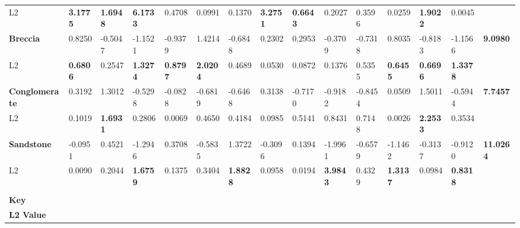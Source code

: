 \begin{landscape}
\begin{table}[H]
{\begin{tabular}{@{}lllllllllllllll@{}}
L2 &
  \cellcolor[HTML]{F4B084}\textbf{3.1775} &
  \cellcolor[HTML]{FFC000}\textbf{1.6948} &
  \cellcolor[HTML]{ED7D31}\textbf{6.1733} &
  0.4708 &
  0.0991 &
  0.1370 &
  \cellcolor[HTML]{F4B084}\textbf{3.2751} &
  \cellcolor[HTML]{FFF2CC}\textbf{0.6643} &
  0.2027 &
  0.3596 &
  0.0259 &
  \cellcolor[HTML]{FFC000}\textbf{1.9022} &
  0.0045 &
  \textbf{} \\
\rowcolor[HTML]{E7E6E6} 
\textbf{Breccia} &
  0.8250 &
  -0.5047 &
  -1.1521 &
  -0.9379 &
  1.4214 &
  -0.6848 &
  0.2302 &
  0.2953 &
  -0.3709 &
  -0.7318 &
  0.8035 &
  -0.8183 &
  -1.1566 &
  \textbf{9.0980} \\
L2 &
  \cellcolor[HTML]{FFF2CC}\textbf{0.6806} &
  0.2547 &
  \cellcolor[HTML]{FFD966}\textbf{1.3274} &
  \cellcolor[HTML]{FFF2CC}\textbf{0.8797} &
  \cellcolor[HTML]{FCE4D6}\textbf{2.0204} &
  0.4689 &
  0.0530 &
  0.0872 &
  0.1376 &
  \cellcolor[HTML]{FFF2CC}0.5355 &
  \cellcolor[HTML]{FFF2CC}\textbf{0.6455} &
  \cellcolor[HTML]{FFF2CC}\textbf{0.6696} &
  \cellcolor[HTML]{FFD966}\textbf{1.3378} &
  \textbf{} \\
\rowcolor[HTML]{E7E6E6} 
\textbf{Conglomerate} &
  0.3192 &
  1.3012 &
  -0.5298 &
  -0.0828 &
  -0.6819 &
  -0.6468 &
  0.3138 &
  -0.7170 &
  -0.9182 &
  -0.8454 &
  0.0509 &
  1.5011 &
  -0.5944 &
  \textbf{7.7457} \\
L2 &
  0.1019 &
  \cellcolor[HTML]{FFC000}\textbf{1.6931} &
  0.2806 &
  0.0069 &
  0.4650 &
  0.4184 &
  0.0985 &
  \cellcolor[HTML]{FFF2CC}0.5141 &
  \cellcolor[HTML]{FFF2CC}0.8431 &
  \cellcolor[HTML]{FFF2CC}0.7148 &
  0.0026 &
  \cellcolor[HTML]{FCE4D6}\textbf{2.2533} &
  0.3534 &
  \textbf{} \\
\rowcolor[HTML]{E7E6E6} 
\textbf{Sandstone} &
  -0.0951 &
  0.4521 &
  -1.2946 &
  0.3708 &
  -0.5835 &
  1.3722 &
  -0.3096 &
  0.1394 &
  -1.9961 &
  -0.6579 &
  -1.1462 &
  -0.3137 &
  -0.9120 &
  \textbf{11.0264} \\
L2 &
  0.0090 &
  0.2044 &
  \cellcolor[HTML]{FFC000}\textbf{1.6759} &
  0.1375 &
  0.3404 &
  \cellcolor[HTML]{FFC000}\textbf{1.8828} &
  0.0958 &
  0.0194 &
  \cellcolor[HTML]{ED7D31}\textbf{3.9843} &
  0.4329 &
  \cellcolor[HTML]{FFD966}\textbf{1.3137} &
  0.0984 &
  \cellcolor[HTML]{FFF2CC}\textbf{0.8318} &
  \textbf{} \\
 &
   &
   &
   &
   &
   &
   &
   &
   &
   &
   &
   &
   &
   &
   \\
\textbf{Key} &
   &
   &
   &
   &
   &
   &
   &
   &
   &
   &
   &
   &
   &
   \\
\textbf{L2 Value} &

\end{tabular}}
\end{table}
\end{landscape}

